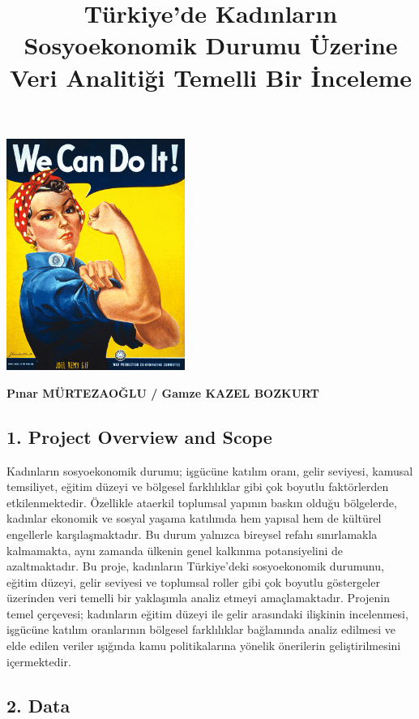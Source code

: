 \documentclass[
  11pt,
  a4paper,
  DIV=11,
  numbers=noendperiod]{scrartcl}
\title{Türkiye'de Kadınların Sosyoekonomik Durumu Üzerine Veri Analitiği
Temelli Bir İnceleme}
\author{}
\date{}
\begin{document}
\maketitle


\includegraphics[width=2.29167in,height=\textheight]{images/we can do it.gif}

\textbf{Pınar MÜRTEZAOĞLU / Gamze KAZEL BOZKURT}

\subsection{1. Project Overview and
Scope}\label{project-overview-and-scope}

Kadınların sosyoekonomik durumu; işgücüne katılım oranı, gelir seviyesi,
kamusal temsiliyet, eğitim düzeyi ve bölgesel farklılıklar gibi çok
boyutlu faktörlerden etkilenmektedir. Özellikle ataerkil toplumsal
yapının baskın olduğu bölgelerde, kadınlar ekonomik ve sosyal yaşama
katılımda hem yapısal hem de kültürel engellerle karşılaşmaktadır. Bu
durum yalnızca bireysel refahı sınırlamakla kalmamakta, aynı zamanda
ülkenin genel kalkınma potansiyelini de azaltmaktadır. Bu proje,
kadınların Türkiye'deki sosyoekonomik durumunu, eğitim düzeyi, gelir
seviyesi ve toplumsal roller gibi çok boyutlu göstergeler üzerinden veri
temelli bir yaklaşımla analiz etmeyi amaçlamaktadır. Projenin temel
çerçevesi; kadınların eğitim düzeyi ile gelir arasındaki ilişkinin
incelenmesi, işgücüne katılım oranlarının bölgesel farklılıklar
bağlamında analiz edilmesi ve elde edilen veriler ışığında kamu
politikalarına yönelik önerilerin geliştirilmesini içermektedir.

\subsection{2. Data}\label{data}
\end{document}
